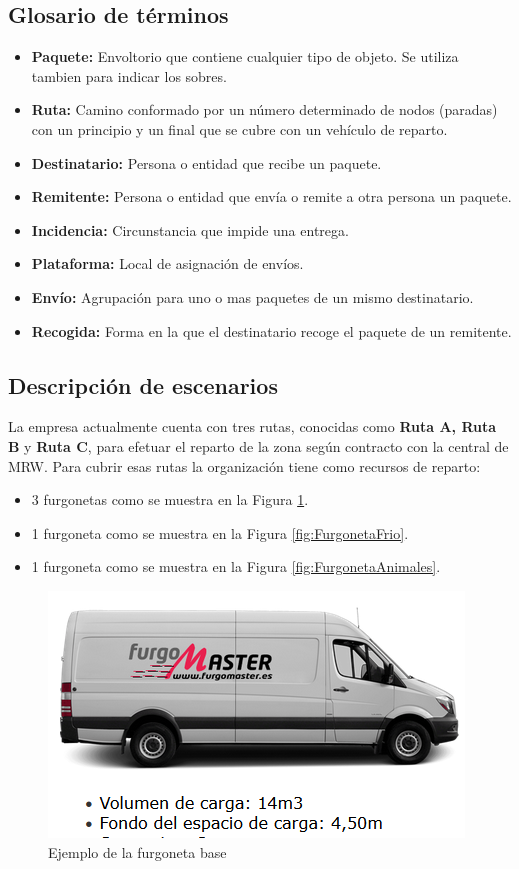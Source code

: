 \subsection{Glosario de términos}
\begin{itemize}
	\item \textbf{Paquete:} Envoltorio que contiene cualquier tipo de objeto. Se utiliza tambien para indicar los sobres.
	\item \textbf{Ruta:} Camino conformado por un número determinado de nodos (paradas) con un principio y un final que se cubre con un vehículo de reparto.  
	\item \textbf{Destinatario:} Persona o entidad que recibe un paquete.
	\item \textbf{Remitente:} Persona o entidad que envía o remite a otra persona un paquete.
	\item \textbf{Incidencia:} Circunstancia que impide una entrega.
	\item \textbf{Plataforma:} Local de asignación de envíos.
	\item \textbf{Envío:} Agrupación para uno o mas paquetes de un mismo destinatario.
	\item \textbf{Recogida:} Forma en la que el destinatario recoge el paquete de un remitente.
\end{itemize}

\subsection{Descripción de escenarios}
La empresa actualmente cuenta con tres rutas, conocidas como \textbf{Ruta A, Ruta B} y \textbf{Ruta C}, para efetuar el reparto de la zona según contracto con la central de MRW. Para cubrir esas rutas la organización tiene como recursos de reparto:
\begin{itemize}
  \item 3 furgonetas como se muestra en la Figura \ref{fig:FurgonetaBase}.
  \item 1 furgoneta como se muestra en la Figura \ref{fig:FurgonetaFrio}.
  \item 1 furgoneta como se muestra en la Figura \ref{fig:FurgonetaAnimales}.
\end{itemize}

\begin{figure}[H]
  \centering
  \includegraphics[scale=0.50]{imaxes/FurgonetaBase.png}
  \caption{\label{fig:FurgonetaBase}Ejemplo de la furgoneta base}
\end{figure}

